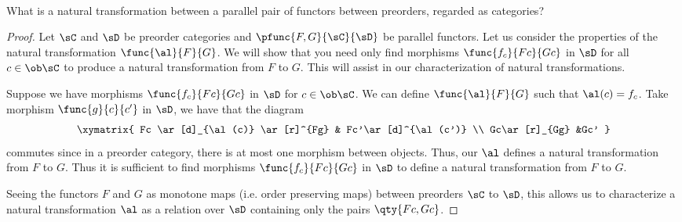 \documentclass[main.tex]{subfiles}
\begin{document}
\paragraph{}
\begin{exercise}
	What is a natural transformation between a parallel pair of functors between
	preorders, regarded as categories?
\end{exercise}

\begin{proof}
	Let $\sC$ and $\sD$ be preorder categories and $\pfunc{F,G}{\sC}{\sD}$ be
	parallel functors. Let us consider the properties of the natural
	transformation $\func{\al}{F}{G}$. We will show that you need only find
	morphisms $\func{f_{c}}{Fc}{Gc}$ in $\sD$ for all $c \in \ob \sC$ to produce
	a natural transformation from $F$ to $G$. This will assist in our
	characterization of natural transformations.

	Suppose we have morphisms $\func{f_{c}}{Fc}{Gc}$ in $\sD$ for $c \in \ob
	\sC$.  We can define $\func{\al}{F}{G}$ such that $\al(c) = f_{c}$. Take
	morphism $\func{g}{c}{c'}$ in $\sD$, we have that the diagram
	\[\xymatrix{ Fc \ar[d]_{\al(c)} \ar[r]^{Fg} & Fc'\ar[d]^{\al(c')}  \\
	Gc\ar[r]_{Gg} &Gc'   }\]
	commutes since in a preorder category, there is at most one
	morphism between objects. Thus, our $\al$ defines a natural
	transformation from $F$ to $G$. Thus it is sufficient to find morphisms
	$\func{f_{c}}{Fc}{Gc}$ in $\sD$ to define a natural transformation from
	$F$ to $G$.

	Seeing the functors $F$ and $G$ as monotone maps (i.e. order preserving
	maps) between preorders $\sC$ to $\sD$, this allows us to characterize a
	natural transformation $\al$ as a relation over $\sD$ containing only the
	pairs $\qty{Fc,Gc}$.
\end{proof}
\end{document}
